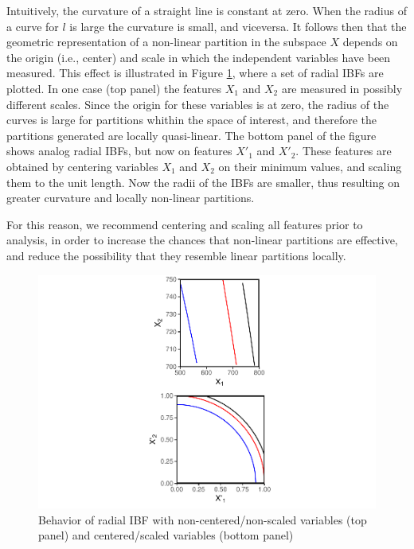 \documentclass[]{elsarticle} %
\makeatletter
\def\maxwidth{\ifdim\Gin@nat@width>\linewidth\linewidth
\else\Gin@nat@width\fi}
\let\Oldincludegraphics\includegraphics
\renewcommand{\includegraphics}[1]{\Oldincludegraphics[width=\maxwidth]{#1}}
\makeatother
\begin{document}
Intuitively, the curvature of a straight line is constant at zero. When
the radius of a curve for \(l\) is large the curvature is small, and
viceversa. It follows then that the geometric representation of a
non-linear partition in the subspace \(X\) depends on the origin (i.e.,
center) and scale in which the independent variables have been measured.
This effect is illustrated in Figure \ref{fig:fig7-curvature}, where a
set of radial IBFs are plotted. In one case (top panel) the features
\(X_1\) and \(X_2\) are measured in possibly different scales. Since the
origin for these variables is at zero, the radius of the curves is large
for partitions whithin the space of interest, and therefore the
partitions generated are locally quasi-linear. The bottom panel of the
figure shows analog radial IBFs, but now on features \(X'_1\) and
\(X'_2\). These features are obtained by centering variables \(X_1\) and
\(X_2\) on their minimum values, and scaling them to the unit length.
Now the radii of the IBFs are smaller, thus resulting on greater
curvature and locally non-linear partitions.

For this reason, we recommend centering and scaling all features prior
to analysis, in order to increase the chances that non-linear partitions
are effective, and reduce the possibility that they resemble linear
partitions locally.

\begin{figure}[htbp]
\centering
\includegraphics{Trees_with_Base_Functions_v2_files/figure-latex/fig7-curvature-1.pdf}
\caption{\label{fig:fig7-curvature}Behavior of radial IBF with
non-centered/non-scaled variables (top panel) and centered/scaled
variables (bottom panel)}
\end{figure}
\end{document}
